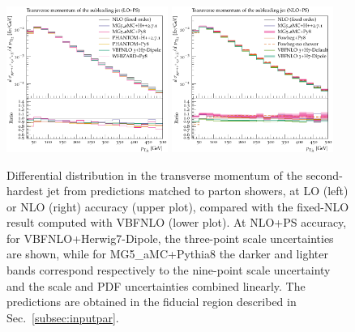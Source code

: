 \documentclass[twocolumn,epjc3]{svjour3} %
\newlength{\width}
\begin{document}
\begin{figure}[hbt]
\centering
\includegraphics[width=0.47\textwidth]{figures/LOPS/pT_j2.pdf}
\includegraphics[width=0.47\textwidth]{figures/NLOPS/pT_j2.pdf}
\caption{Differential distribution in the
transverse momentum of the second-hardest jet
from predictions matched to parton showers, at LO (left) or NLO (right) accuracy (upper plot), compared with the fixed-NLO result computed with {\sc VBFNLO} (lower plot). At NLO+PS accuracy, for
    {\sc VBFNLO}+{\sc Herwig7-Dipole}, the three-point scale uncertainties are shown, while for {\sc MG5\_aMC}+{\sc Pythia8} the darker and lighter bands correspond
    respectively to the nine-point scale uncertainty and the scale and PDF uncertainties combined linearly.
    The predictions are obtained in the fiducial region described in Sec.~\protect\ref{subsec:inputpar}.}
\label{fig:PSpt2}
\end{figure}
\end{document}
